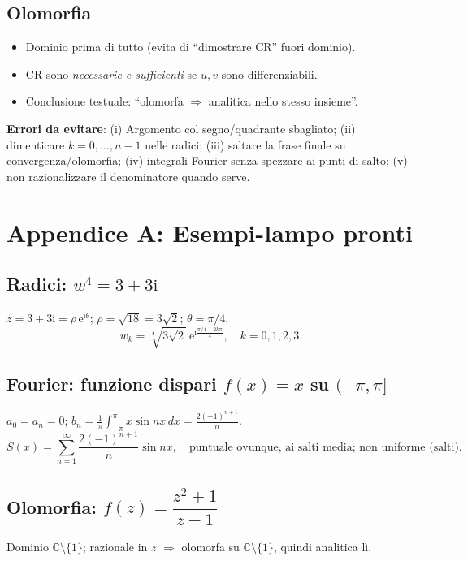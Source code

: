 \documentclass[11pt,a4paper]{article}
\newcommand{\C}{\mathbb{C}}
\newcommand{\e}{\mathrm{e}}
\newcommand{\ii}{\mathrm{i}}
\theoremstyle{definition}
\begin{document}
\subsection*{Olomorfia}
\begin{itemize}
\item Dominio prima di tutto (evita di “dimostrare CR” fuori dominio).
\item CR sono \emph{necessarie e sufficienti} se $u,v$ sono differenziabili.
\item Conclusione testuale: “olomorfa $\Rightarrow$ analitica nello stesso insieme”.
\end{itemize}

\begin{alertbox}
\textbf{Errori da evitare}: (i) Argomento col segno/quadrante sbagliato; (ii) dimenticare $k=0,\dots,n-1$ nelle radici;
(iii) saltare la frase finale su convergenza/olomorfia; (iv) integrali Fourier senza spezzare ai punti di salto;
(v) non razionalizzare il denominatore quando serve.
\end{alertbox}

\section*{Appendice A: Esempi-lampo pronti}

\subsection*{Radici: $w^4=3+3\ii$}
$z=3+3\ii=\rho\,\e^{\ii\theta}$; $\rho=\sqrt{18}=3\sqrt{2}$; $\theta=\pi/4$.
\[
w_k=\sqrt[4]{3\sqrt{2}}\ \e^{\ii\frac{\pi/4+2k\pi}{4}},\quad k=0,1,2,3.
\]

\subsection*{Fourier: funzione dispari $f(x)=x$ su $(-\pi,\pi]$}
$a_0=a_n=0$;\; $b_n=\frac{1}{\pi}\int_{-\pi}^{\pi}x\sin nx\,dx=\frac{2(-1)^{n+1}}{n}$.
\[
S(x)=\sum_{n=1}^{\infty}\frac{2(-1)^{n+1}}{n}\sin nx,\quad
\text{puntuale ovunque, ai salti media; non uniforme (salti).}
\]

\subsection*{Olomorfia: $f(z)=\dfrac{z^2+1}{z-1}$}
Dominio $\C\setminus\{1\}$;\; razionale in $z$ $\Rightarrow$ olomorfa su $\C\setminus\{1\}$, quindi analitica lì.
\end{document}
